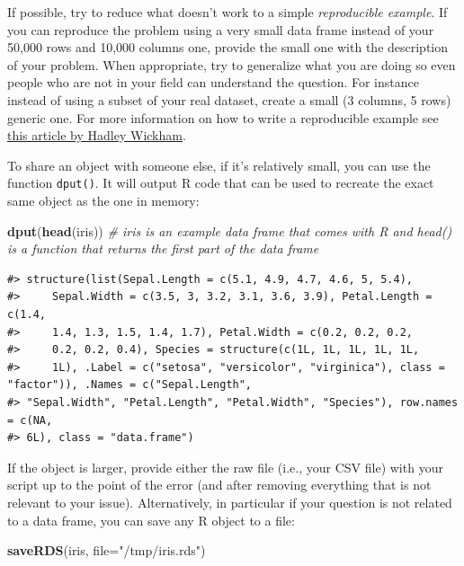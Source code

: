 \documentclass[]{book}
\newenvironment{Shaded}{\begin{snugshade}}{\end{snugshade}}
\newcommand{\KeywordTok}[1]{\textcolor[rgb]{0.13,0.29,0.53}{\textbf{{#1}}}}
\newcommand{\DataTypeTok}[1]{\textcolor[rgb]{0.13,0.29,0.53}{{#1}}}
\newcommand{\StringTok}[1]{\textcolor[rgb]{0.31,0.60,0.02}{{#1}}}
\newcommand{\CommentTok}[1]{\textcolor[rgb]{0.56,0.35,0.01}{\textit{{#1}}}}
\newcommand{\NormalTok}[1]{{#1}}
\theoremstyle{definition}
\theoremstyle{definition}
\theoremstyle{remark}
\begin{document}
If possible, try to reduce what doesn't work to a simple
\emph{reproducible example}. If you can reproduce the problem using a
very small data frame instead of your 50,000 rows and 10,000 columns
one, provide the small one with the description of your problem. When
appropriate, try to generalize what you are doing so even people who are
not in your field can understand the question. For instance instead of
using a subset of your real dataset, create a small (3 columns, 5 rows)
generic one. For more information on how to write a reproducible example
see \href{http://adv-r.had.co.nz/Reproducibility.html}{this article by
Hadley Wickham}.

To share an object with someone else, if it's relatively small, you can
use the function \texttt{dput()}. It will output R code that can be used
to recreate the exact same object as the one in memory:

\begin{Shaded}
\begin{Highlighting}[]
\KeywordTok{dput}\NormalTok{(}\KeywordTok{head}\NormalTok{(iris)) }\CommentTok{# iris is an example data frame that comes with R and head() is a function that returns the first part of the data frame}
\end{Highlighting}
\end{Shaded}

\begin{verbatim}
#> structure(list(Sepal.Length = c(5.1, 4.9, 4.7, 4.6, 5, 5.4), 
#>     Sepal.Width = c(3.5, 3, 3.2, 3.1, 3.6, 3.9), Petal.Length = c(1.4, 
#>     1.4, 1.3, 1.5, 1.4, 1.7), Petal.Width = c(0.2, 0.2, 0.2, 
#>     0.2, 0.2, 0.4), Species = structure(c(1L, 1L, 1L, 1L, 1L, 
#>     1L), .Label = c("setosa", "versicolor", "virginica"), class = "factor")), .Names = c("Sepal.Length", 
#> "Sepal.Width", "Petal.Length", "Petal.Width", "Species"), row.names = c(NA, 
#> 6L), class = "data.frame")
\end{verbatim}

If the object is larger, provide either the raw file (i.e., your CSV
file) with your script up to the point of the error (and after removing
everything that is not relevant to your issue). Alternatively, in
particular if your question is not related to a data frame, you can save
any R object to a file:

\begin{Shaded}
\begin{Highlighting}[]
\KeywordTok{saveRDS}\NormalTok{(iris, }\DataTypeTok{file=}\StringTok{"/tmp/iris.rds"}\NormalTok{)}
\end{Highlighting}
\end{Shaded}
\end{document}

